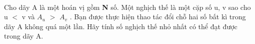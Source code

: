  

Cho dãy A là một hoán vị gồm \textbf{ N } số. Một nghịch thế là một cặp số u, v sao cho u $<$ v và $A_{u}$ $>$ $A_{v}$ . Bạn được thực hiện thao tác đổi chỗ hai số bất kì trong dãy A không quá một lần. Hãy tính số nghịch thế nhỏ nhất có thể đạt được trong dãy A.